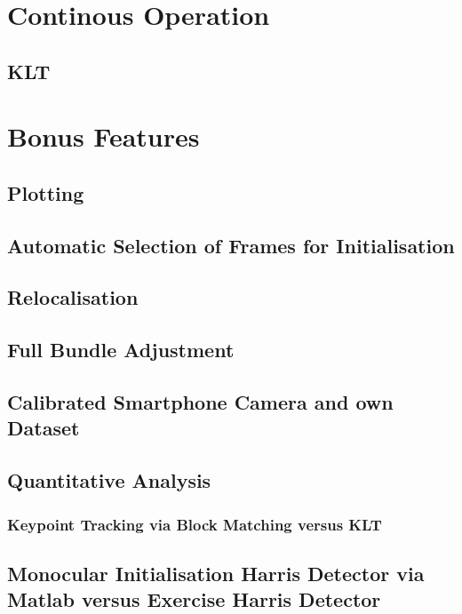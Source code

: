 \section{Continous Operation}
\label{s:ContOp}

\subsection{KLT}

\section{Bonus Features}
\label{s:BF}

\subsection{Plotting}

\subsection{Automatic Selection of Frames for Initialisation}

\subsection{Relocalisation}

\subsection{Full Bundle Adjustment}

\subsection{Calibrated Smartphone Camera and own Dataset}

\subsection{Quantitative Analysis}
\subsubsection{Keypoint Tracking via Block Matching versus KLT}
\subsection{Monocular Initialisation Harris Detector via Matlab versus Exercise Harris Detector}